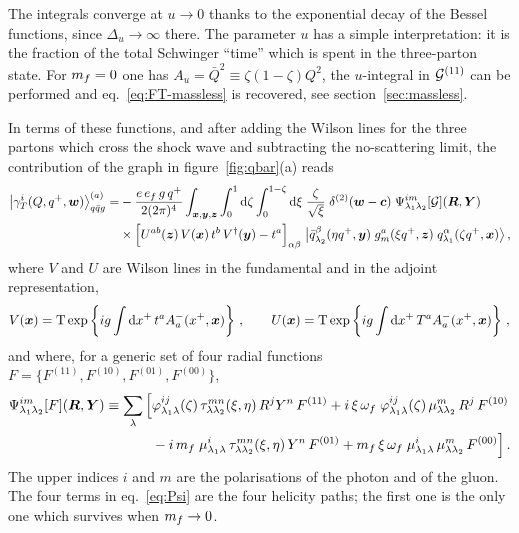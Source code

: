 The integrals converge at $u\to0$ thanks to the exponential decay of the Bessel functions, since
$\Delta_u\to\infty$ there. The parameter $u$ has a simple interpretation: it is the fraction of the
total Schwinger ``time'' which is spent in the three-parton state. For $m_f=0$ one has $A_u=\bar
Q^2\equiv\zeta(1-\zeta)Q^2$, the $u$-integral in $\mathcal{G}^{(11)}$ can be performed and
eq.~\eqref{eq:FT-massless} is recovered, see section~\ref{sec:massless}.

In terms of these functions, and after adding the Wilson lines for the three partons which cross the
shock wave and subtracting the no-scattering limit, the contribution of the graph in
figure~\ref{fig:qbar}(a) reads
\begin{align}
\big|\gamma_T^i(Q,q^+,\bm{w})\big\rangle^{(a)}_{q\bar q g}=&-\frac{e\,e_f\,g\,q^+}{2(2\pi)^4}\int_{\bm{x},\bm{y},\bm{z}}
\int_0^1{\rm d}\zeta\int_0^{1-\zeta}{\rm d}\xi\;\frac{\zeta}{\sqrt\xi}\;\delta^{(2)}(\bm{w}-\bm{c})\;
\Psi^{im}_{\lambda_1\lambda_2}[\mathcal{G}](\bm{R},\bm{Y})
\nonumber\\
&\times\Big[U^{ab}(\bm{z})\,V(\bm{x})\,t^b\,V^\dagger(\bm{y})-t^a\Big]_{\alpha\beta}\;
\big|\bar q^\beta_{\lambda_2}(\eta q^+,\bm{y})\;g^a_m(\xi q^+,\bm{z})\;q^\alpha_{\lambda_1}(\zeta q^+,\bm{x})\big\rangle\,,
\label{eq:wf-a}
\end{align}
where $V$ and $U$ are Wilson lines in the fundamental and in the adjoint representation,
\begin{equation}
V(\bm{x})={\rm T}\exp\left\{ig\int{\rm d} x^+\,t^a A^-_a(x^+,\bm{x})\right\}\,,\qquad
U(\bm{x})={\rm T}\exp\left\{ig\int{\rm d} x^+\,T^a A^-_a(x^+,\bm{x})\right\}\,,
\end{equation}
and where, for a generic set of four radial functions $F=\{F^{(11)},F^{(10)},F^{(01)},F^{(00)}\}$,
\begin{align}
\Psi^{im}_{\lambda_1\lambda_2}[F](\bm{R},\bm{Y})\equiv\sum_\lambda\Big[&
\varphi^{ij}_{\lambda_1\lambda}(\zeta)\,\tau^{mn}_{\lambda\lambda_2}(\xi,\eta)\,R^jY^n\,F^{(11)}
+i\,\xi\,\omega_f\;\varphi^{ij}_{\lambda_1\lambda}(\zeta)\,\mu^m_{\lambda\lambda_2}\,R^j\,F^{(10)}
\nonumber\\
&-i\,m_f\;\mu^i_{\lambda_1\lambda}\,\tau^{mn}_{\lambda\lambda_2}(\xi,\eta)\,Y^n\,F^{(01)}
+m_f\,\xi\,\omega_f\;\mu^i_{\lambda_1\lambda}\,\mu^m_{\lambda\lambda_2}\,F^{(00)}\Big]\,.
\label{eq:Psi}
\end{align}
The upper indices $i$ and $m$ are the polarisations of the photon and of the gluon. The four terms in
eq.~\eqref{eq:Psi} are the four helicity paths; the first one is the only one which survives when
$m_f\to0$.

